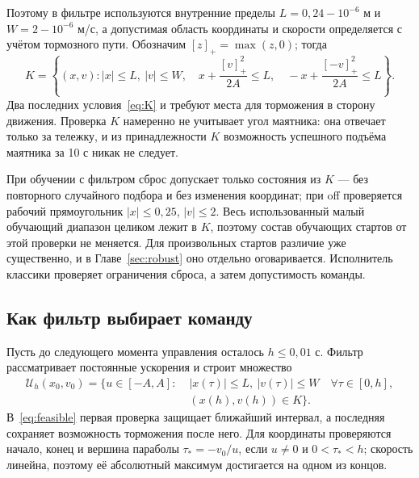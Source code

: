 Поэтому в фильтре используются внутренние пределы $L=0{,}24-10^{-6}$ м и $W=2-10^{-6}$ м/с, а допустимая область координаты и скорости определяется с учётом тормозного пути. Обозначим $[z]_+=\max(z,0)$; тогда
\begin{equation}
K=\left\{(x,v): |x|\leq L,\ |v|\leq W,\quad
x+\frac{[v]_+^2}{2A}\leq L,\quad
-x+\frac{[-v]_+^2}{2A}\leq L\right\}.
\label{eq:K}
\end{equation}
Два последних условия~\eqref{eq:K} и требуют места для торможения в сторону движения. Проверка $K$ намеренно не учитывает угол маятника: она отвечает только за тележку, и из принадлежности $K$ возможность успешного подъёма маятника за 10 с никак не следует.

При обучении с фильтром сброс допускает только состояния из $K$ — без повторного случайного подбора и без изменения координат; при off проверяется рабочий прямоугольник $|x|\leq0{,}25$, $|v|\leq2$. Весь использованный малый обучающий диапазон целиком лежит в $K$, поэтому состав обучающих стартов от этой проверки не меняется. Для произвольных стартов различие уже существенно, и в Главе~\ref{sec:robust} оно отдельно оговаривается. Исполнитель классики проверяет ограничения сброса, а затем допустимость команды.

\subsection{Как фильтр выбирает команду}
Пусть до следующего момента управления осталось $h\leq0{,}01$ с. Фильтр рассматривает постоянные ускорения и строит множество
\begin{equation}
\begin{split}
\mathcal U_h(x_0,v_0)=\{u\in[-A,A]:\;&|x(\tau)|\leq L,\ |v(\tau)|\leq W
\quad\forall\tau\in[0,h],\\
&(x(h),v(h))\in K\}.
\end{split}\label{eq:feasible}
\end{equation}
В~\eqref{eq:feasible} первая проверка защищает ближайший интервал, а последняя сохраняет возможность торможения после него. Для координаты проверяются начало, конец и вершина параболы $\tau_*=-v_0/u$, если $u\ne0$ и $0<\tau_*<h$; скорость линейна, поэтому её абсолютный максимум достигается на одном из концов.

